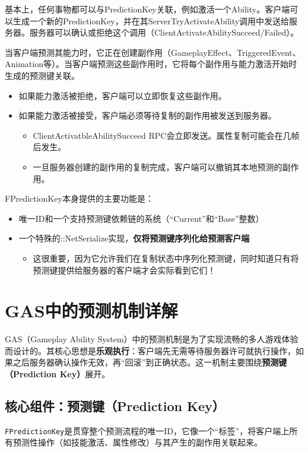 \documentclass[10pt,CJKmath]{ctexart}
\begin{document}
基本上，任何事物都可以与PredictionKey关联，例如激活一个Ability。客户端可以生成一个新的PredictionKey，并在其ServerTryActivateAbility调用中发送给服务器。服务器可以确认或拒绝这个调用（ClientActivateAbilitySucceed/Failed）。

当客户端预测其能力时，它正在创建副作用（GameplayEffect、TriggeredEvent、Animation等）。当客户端预测这些副作用时，它将每个副作用与能力激活开始时生成的预测键关联。

\begin{itemize}
	\item 如果能力激活被拒绝，客户端可以立即恢复这些副作用。
	\item 如果能力激活被接受，客户端必须等待复制的副作用被发送到服务器。
	\begin{itemize}
		\item ClientActivatbleAbilitySucceed RPC会立即发送。属性复制可能会在几帧后发生。
		\item 一旦服务器创建的副作用的复制完成，客户端可以撤销其本地预测的副作用。
	\end{itemize}
\end{itemize}

FPredictionKey本身提供的主要功能是：
\begin{itemize}
	\item 唯一ID和一个支持预测键依赖链的系统（“Current”和“Base”整数）
	\item 一个特殊的::NetSerialize实现，\textbf{仅将预测键序列化给预测客户端}
	\begin{itemize}
		\item 这很重要，因为它允许我们在复制状态中序列化预测键，同时知道只有将预测键提供给服务器的客户端才会实际看到它们！
	\end{itemize}
\end{itemize}

	
	\section{GAS中的预测机制详解}
	GAS（Gameplay Ability System）中的预测机制是为了实现流畅的多人游戏体验而设计的。其核心思想是\textbf{乐观执行}：客户端先无需等待服务器许可就执行操作，如果之后服务器确认操作无效，再“回滚”到正确状态。这一机制主要围绕\textbf{预测键（Prediction Key）}展开。
	
	\subsection{核心组件：预测键（Prediction Key）}
	\texttt{FPredictionKey}是贯穿整个预测流程的唯一ID，它像一个“标签”，将客户端上所有预测性操作（如技能激活、属性修改）与其产生的副作用关联起来。
	
\end{document}
